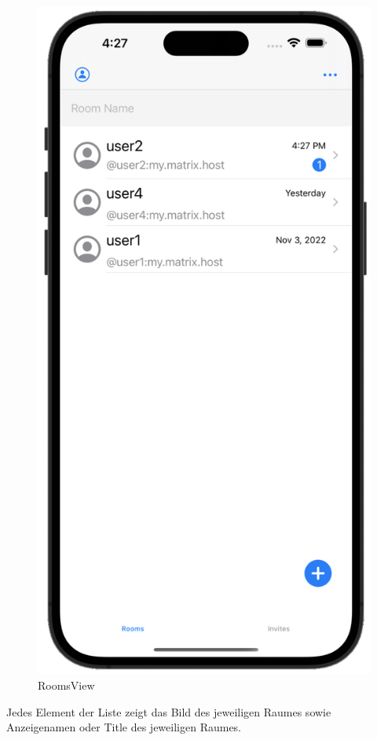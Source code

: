     \begin{figure}[h]
        \includegraphics[scale=0.5]{rooms_white}
        \centering
        \caption{RoomsView}\label{fig:roomsview}
    \end{figure}
    Jedes Element der Liste zeigt das Bild des jeweiligen Raumes sowie Anzeigenamen oder Title des jeweiligen Raumes.
